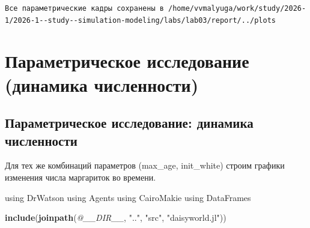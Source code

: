 \documentclass[
  english,
  russian,
  12pt,
  a4paper,
  DIV=11,
  numbers=noendperiod]{scrreprt}
\newenvironment{Shaded}{\begin{snugshade}}{\end{snugshade}}
\newcommand{\BuiltInTok}[1]{#1}
\newcommand{\CommentTok}[1]{\textcolor[rgb]{0.56,0.35,0.01}{\textit{#1}}}
\newcommand{\FunctionTok}[1]{\textcolor[rgb]{0.13,0.29,0.53}{\textbf{#1}}}
\newcommand{\ImportTok}[1]{#1}
\newcommand{\NormalTok}[1]{#1}
\newcommand{\OperatorTok}[1]{\textcolor[rgb]{0.81,0.36,0.00}{\textbf{#1}}}
\newcommand{\PreprocessorTok}[1]{\textcolor[rgb]{0.56,0.35,0.01}{\textit{#1}}}
\newcommand{\SpecialCharTok}[1]{\textcolor[rgb]{0.81,0.36,0.00}{\textbf{#1}}}
\newcommand{\StringTok}[1]{\textcolor[rgb]{0.31,0.60,0.02}{#1}}
\begin{document}
\begin{Shaded}
\end{Shaded}

\begin{verbatim}
Все параметрические кадры сохранены в /home/vvmalyuga/work/study/2026-1/2026-1--study--simulation-modeling/labs/lab03/report/../plots
\end{verbatim}

\section{Параметрическое исследование (динамика
численности)}\label{ux43fux430ux440ux430ux43cux435ux442ux440ux438ux447ux435ux441ux43aux43eux435-ux438ux441ux441ux43bux435ux434ux43eux432ux430ux43dux438ux435-ux434ux438ux43dux430ux43cux438ux43aux430-ux447ux438ux441ux43bux435ux43dux43dux43eux441ux442ux438}

\subsection{Параметрическое исследование: динамика
численности}\label{ux43fux430ux440ux430ux43cux435ux442ux440ux438ux447ux435ux441ux43aux43eux435-ux438ux441ux441ux43bux435ux434ux43eux432ux430ux43dux438ux435-ux434ux438ux43dux430ux43cux438ux43aux430-ux447ux438ux441ux43bux435ux43dux43dux43eux441ux442ux438-1}

Для тех же комбинаций параметров (max\_age, init\_white) строим графики
изменения числа маргариток во времени.

\begin{Shaded}
\begin{Highlighting}[]
\ImportTok{using} \BuiltInTok{DrWatson}
\ImportTok{using} \BuiltInTok{Agents}
\ImportTok{using} \BuiltInTok{CairoMakie}
\ImportTok{using} \BuiltInTok{DataFrames}

\FunctionTok{include}\NormalTok{(}\FunctionTok{joinpath}\NormalTok{(}\PreprocessorTok{@\_\_DIR\_\_}\NormalTok{, }\StringTok{".."}\NormalTok{, }\StringTok{"src"}\NormalTok{, }\StringTok{"daisyworld.jl"}\NormalTok{))}
\end{Highlighting}
\end{Shaded}
\end{document}

